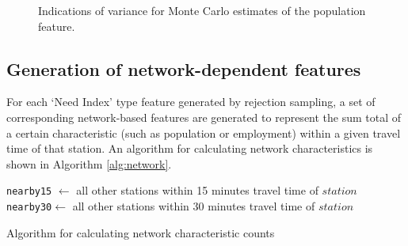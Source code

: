 \documentclass[11pt]{article}
\begin{document}
\begin{figure}[H]
\centering
{}
\caption{Indications of variance for Monte Carlo estimates of the population feature.}\label{fig:mcvar}
\end{figure}

\subsection{Generation of network-dependent features}\label{sec:net}

For each `Need Index' type feature generated by rejection sampling, a set of corresponding network-based features are generated to represent the sum total of a certain characteristic (such as population or employment) within a given travel time of that station. An algorithm for calculating network characteristics is shown in Algorithm \ref{alg:network}. 

\begin{algorithm}
\begin{algorithmic}
	\State\texttt{nearby15} $\gets$ all other stations within 15 minutes travel time of $station$
	\State \texttt{nearby30}$ \gets$ all other stations within 30 minutes travel time of $station$
		\EndFor
		\EndFor
	\EndFor
\EndFor
\end{algorithmic}\caption{Algorithm for calculating network characteristic counts}\label{alg:network}
\end{algorithm}
\end{document}
